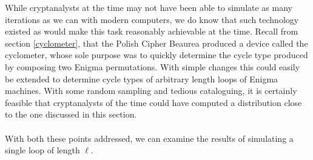 While cryptanalysts at the time may not have been able to simulate as many iterations as we can with modern computers, we do know that such technology existed as would make this task reasonably achievable at the time. Recall from section \ref{cyclometer}, that the Polish Cipher Beaurea produced a device called the cyclometer, whose sole purpose was to quickly determine the cycle type produced by composing two Enigma permutations. With simple changes this could easily be extended to determine cycle types of arbitrary length loops of Enigma machines. With some random sampling and tedious cataloguing, it is certainly feasible that cryptanalysts of the time could have computed a distribution close to the one discussed in this section.
\\\\With both these points addressed, we can examine the results of simulating a single loop of length $\ell$.
